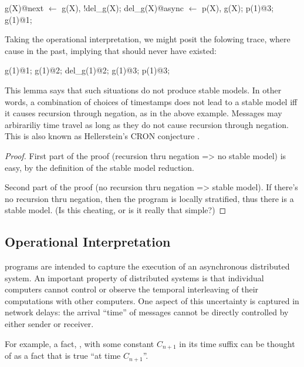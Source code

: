 \begin{Dedalus}
g(X)@next \(\leftarrow\) g(X), !del_g(X);
del_g(X)@async \(\leftarrow\) p(X), g(X);
p(1)@3;
g(1)@1;
\end{Dedalus}

Taking the operational interpretation, we might posit the folowing trace, where  cause  in the past, implying that  should never have existed:

\begin{Dedalus}
g(1)@1;
g(1)@2;
del_g(1)@2;
g(1)@3;
p(1)@3;
\end{Dedalus}

This lemma says that such situations do not produce stable models.  In other words, a combination of choices of timestamps does not lead to a stable model iff it causes recursion through negation, as in the above example.  Messages may arbirariliy time travel as long as they do not cause recursion through negation.  This is also known as Hellerstein's CRON conjecture .

\begin{proof}

First part of the proof (recursion thru negation => no stable model) is easy, by the definition of the stable model reduction.

Second part of the proof (no recursion thru negation => stable model).  If there's no recursion thru negation, then the program is locally stratified, thus there is a stable model.  (Is this cheating, or is it really that simple?)

\end{proof}

\subsection{Operational Interpretation}
\lang programs are intended to capture the execution of an asynchronous distributed system.  An important property of distributed systems is that individual computers cannot control or observe the temporal interleaving of their computations with other computers.  One aspect of this uncertainty is captured in network delays: the arrival ``time'' of messages cannot be directly controlled by either sender or receiver.

For example, a fact, , with some constant $C_{n+1}$ in its time
suffix can be thought of as a fact that is true ``at time $C_{n+1}$''.

